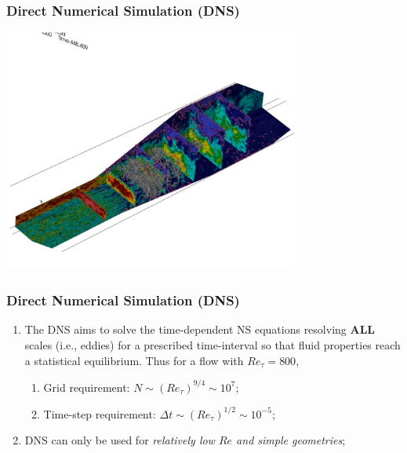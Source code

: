 \documentclass[10pt,compress]{beamer}
\begin{document}
\begin{frame}
 \frametitle{Direct Numerical Simulation (DNS)}
      \begin{center}
        \includegraphics[width=9.cm, height=8cm, clip]{./Figs/DNS_Exampleb}
      \end{center}
\end{frame}


\begin{frame}
 \frametitle{Direct Numerical Simulation (DNS)}
    \begin{enumerate}
       \item<1-> The DNS aims to solve the time-dependent NS equations resolving {\bf ALL} scales (i.e., eddies) for a prescribed time-interval so that fluid properties reach a statistical equilibrium. Thus for a flow with $Re_{\tau}=800$,
          \begin{enumerate}
            \item<1-> Grid requirement: $N\sim\left(Re_{\tau}\right)^{9/4}\sim 10^{7}$;
            \item<1-> Time-step requirement: $\Delta t\sim \left(Re_{\tau}\right)^{1/2}\sim 10^{-5}$;
          \end{enumerate}
       \item<2-> DNS can only be used for {\it relatively low $Re$ and simple geometries};
    \end{enumerate} 
\end{frame}
\end{document}
